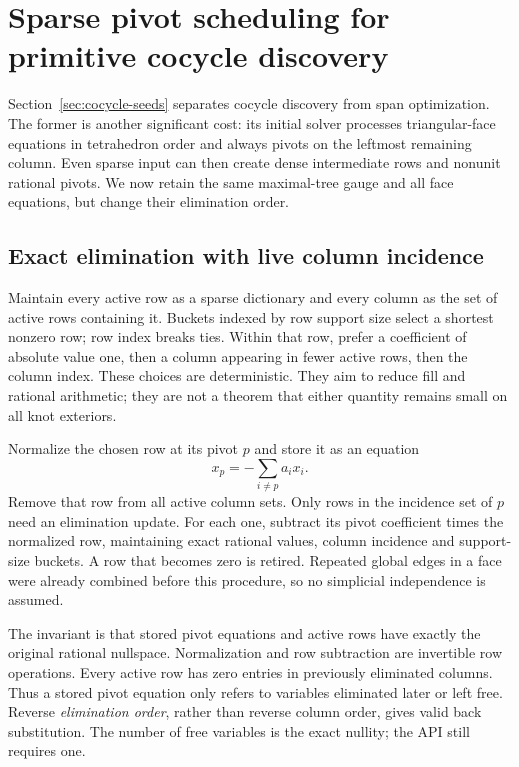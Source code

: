 \section{Sparse pivot scheduling for primitive cocycle discovery}
\label{sec:cocycle-sparse}

Section~\ref{sec:cocycle-seeds} separates cocycle discovery from span
optimization. The former is another significant cost: its initial solver
processes triangular-face equations in tetrahedron order and always pivots
on the leftmost remaining column. Even sparse input can then create dense
intermediate rows and nonunit rational pivots. We now retain the same
maximal-tree gauge and all face equations, but change their elimination order.

\subsection{Exact elimination with live column incidence}

Maintain every active row as a sparse dictionary and every column as the
set of active rows containing it. Buckets indexed by row support size select
a shortest nonzero row; row index breaks ties. Within that row, prefer a
coefficient of absolute value one, then a column appearing in fewer active
rows, then the column index. These choices are deterministic. They aim to
reduce fill and rational arithmetic; they are not a theorem that either
quantity remains small on all knot exteriors.

Normalize the chosen row at its pivot $p$ and store it as an equation
\[
 x_p=-\sum_{i\ne p}a_i x_i.
\]
Remove that row from all active column sets. Only rows in the incidence set
of $p$ need an elimination update. For each one, subtract its pivot
coefficient times the normalized row, maintaining exact rational values,
column incidence and support-size buckets. A row that becomes zero is
retired. Repeated global edges in a face were already combined before
this procedure, so no simplicial independence is assumed.

The invariant is that stored pivot equations and active rows have exactly
the original rational nullspace. Normalization and row subtraction are
invertible row operations. Every active row has zero entries in previously
eliminated columns. Thus a stored pivot equation only refers to variables
eliminated later or left free. Reverse \emph{elimination order}, rather than
reverse column order, gives valid back substitution. The number of free
variables is the exact nullity; the API still requires one.

